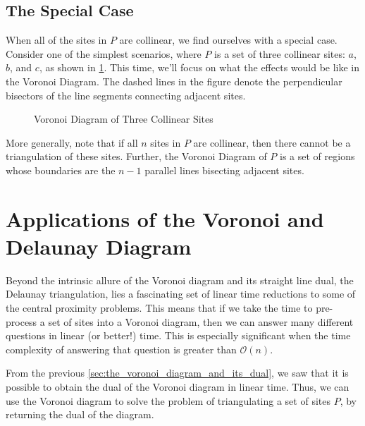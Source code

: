 \documentclass[12pt,twoside]{reedthesis}
\begin{document}
    \subsection{The Special Case} %
    \label{sub:special_case}

      When all of the sites in $P$ are collinear, we find ourselves with a special case. Consider one of the simplest scenarios, where $P$ is a set of three collinear sites: $a$, $b$, and $c$, as shown in \cref{fig:collinear}. This time, we'll focus on what the effects would be like in the Voronoi Diagram. The dashed lines in the figure denote the perpendicular bisectors of the line segments connecting adjacent sites. \par  

      \begin{figure}[!htb]
        \centering
        
        \caption{Voronoi Diagram of Three Collinear Sites}
        \label{fig:collinear}
      \end{figure}

      More generally, note that if all $n$ sites in $P$ are collinear, then there cannot be a triangulation of these sites. Further, the Voronoi Diagram of $P$ is a set of regions whose boundaries are the $n-1$ parallel lines bisecting adjacent sites. 


  \section{Applications of the Voronoi and Delaunay Diagram} %
  \label{sec:applications_of_voronoi_and_delaunay_diagrams}
    Beyond the intrinsic allure of the Voronoi diagram and its straight line dual, the Delaunay triangulation, lies a fascinating set of linear time reductions to some of the central proximity problems. This means that if we take the time to pre-process a set of sites into a Voronoi diagram, then we can answer many different questions in linear (or better!) time. This is especially significant when the time complexity of answering that question is greater than $\mathcal{O}(n)$.\par 

    From the previous \cref{sec:the_voronoi_diagram_and_its_dual}, we saw that it is possible to obtain the dual of the Voronoi diagram in linear time. Thus, we can use the Voronoi diagram to solve the problem of triangulating a set of sites $P$, by returning the dual of the diagram. 
\end{document}
